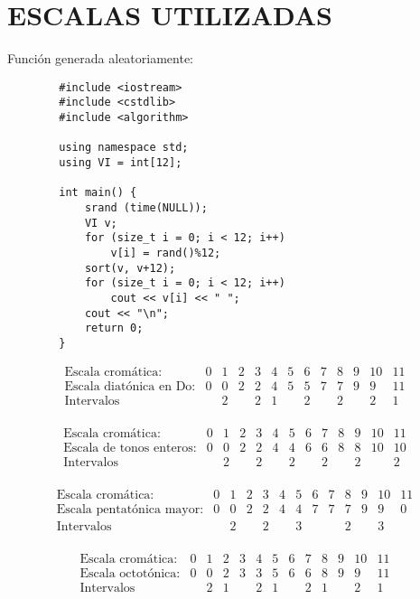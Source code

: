 	\section{ESCALAS UTILIZADAS}

        Función generada aleatoriamente:
        \begin{lstlisting}
        #include <iostream>
        #include <cstdlib>
        #include <algorithm>
        
        using namespace std;
        using VI = int[12];
        
        int main() {
        	srand (time(NULL));
        	VI v;
        	for (size_t i = 0; i < 12; i++)
        		v[i] = rand()%12;
        	sort(v, v+12);
        	for (size_t i = 0; i < 12; i++)
        		cout << v[i] << " ";
        	cout << "\n";
        	return 0;
        }        
        \end{lstlisting}

        $$\left.\begin{matrix}
        \text{Escala cromática:}&0&1&2&3&4&5&6&7&8&9&10&11\\
        \text{Escala diatónica en Do:}&0&0&2&2&4&5&5&7&7&9&9&11\\
        \text{Intervalos}&&2&&2&1&&2&&2&&2&1\\
        \end{matrix}\right.$$

        $$\left.\begin{matrix}
        \text{Escala cromática:}&0&1&2&3&4&5&6&7&8&9&10&11\\
        \text{Escala de tonos enteros:}&0&0&2&2&4&4&6&6&8&8&10&10\\
        \text{Intervalos}&&2&&2&&2&&2&&2&&2\\
        \end{matrix}\right.$$

        $$\left.\begin{matrix}
        \text{Escala cromática:}&0&1&2&3&4&5&6&7&8&9&10&11\\
        \text{Escala pentatónica mayor:}&0&0&2&2&4&4&7&7&7&9&9&0\\
        \text{Intervalos}&&2&&2&&3&&&2&&3&\\
        \end{matrix}\right.$$
        
        $$\left.\begin{matrix}
        \text{Escala cromática:}&0&1&2&3&4&5&6&7&8&9&10&11\\
        \text{Escala octotónica:}&0&0&2&3&3&5&6&6&8&9&9&11\\
        \text{Intervalos}&&2&1&&2&1&&2&1&&2&1\\
        \end{matrix}\right.$$
           
